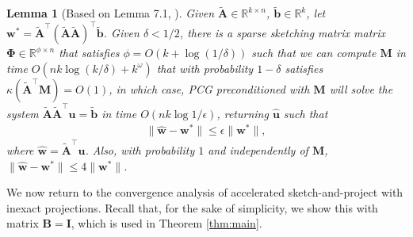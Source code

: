 \documentclass[11pt]{article}
\let\origtop\top
\renewcommand\top{{\scriptscriptstyle{\origtop}}}
\def\w{{\mathbf w}}
\def\u{{\mathbf u}}
\def\b{{\mathbf b}}
\def\A{{\mathbf A}}
\def\B{{\mathbf B}}
\def\I{{\mathbf I}}
\def\M{{\mathbf M}}
\def\R{{\mathbf R}}
\def\R{{\mathds R}}
\newtheorem{lem}[thm]{Lemma}
\begin{document}
\begin{lem}[Based on Lemma 7.1, \cite{derezinski2023solving}]\label{l:pcg}
Given $\tilde{\A} \in \R^{k \times n}$, $\tilde{\b} \in \R^k$, let $\w^* = \tilde{\A}^\top(\tilde\A\tilde\A)^\top\tilde{\b}$. Given $\delta <1/2$, there is a sparse sketching matrix matrix $\mathbf{\Phi} \in \R^{\phi\times n}$ that satisfies $\phi = O(k+\log(1/\delta))$ such that we can compute  $\M$ in time $O(nk \log(k/\delta) + k^{\omega})$ that with probability $1 - \delta$ satisfies $\kappa(\tilde{\A}^\top\M) = O(1)$, in which case, PCG preconditioned with $\M$ will solve the  system $\tilde\A\tilde\A^\top\u=\tilde\b$ in time $O(nk\log1/\epsilon)$, returning $\hat\u$ such that
\begin{align*}
\|\hat\w-\w^*\|\leq\epsilon\|\w^*\|,
\end{align*}
where $\hat\w = \tilde\A^\top\u$. Also,  with probability $1$ and independently of $\M$, $\|\hat\w-\w^*\|\leq 4\|\w^*\|$.
\end{lem}


We now return to the convergence analysis of accelerated sketch-and-project with inexact projections. Recall that, for the sake of simplicity, we show this with matrix $\B=\I$, which is used in Theorem \ref{thm:main}.
\end{document}
